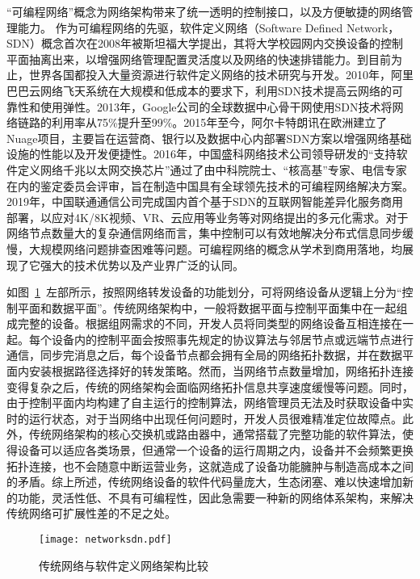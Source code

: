 “可编程网络”概念为网络架构带来了统一透明的控制接口，以及方便敏捷的网络管理能力。
作为可编程网络的先驱，软件定义网络（Software Defined Network，SDN）概念首次在2008年被斯坦福大学提出，其将大学校园网内交换设备的控制平面抽离出来，以增强网络管理配置灵活度以及网络的快速排错能力。到目前为止，世界各国都投入大量资源进行软件定义网络的技术研究与开发。2010年，阿里巴巴云网络飞天系统在大规模和低成本的要求下，利用SDN技术提高云网络的可靠性和使用弹性。2013年，Google公司的全球数据中心骨干网使用SDN技术将网络链路的利用率从75\%提升至99\%。2015年至今，阿尔卡特朗讯在欧洲建立了Nuage项目，主要旨在运营商、银行以及数据中心内部署SDN方案以增强网络基础设施的性能以及开发便捷性。2016年，中国盛科网络技术公司领导研发的“支持软件定义网络千兆以太网交换芯片”通过了由中科院院士、“核高基”专家、电信专家在内的鉴定委员会评审，旨在制造中国具有全球领先技术的可编程网络解决方案。2019年，中国联通通信公司完成国内首个基于SDN的互联网智能差异化服务商用部署，以应对4K/8K视频、VR、云应用等业务等对网络提出的多元化需求。对于网络节点数量大的复杂通信网络而言，集中控制可以有效地解决分布式信息同步缓慢，大规模网络问题排查困难等问题。可编程网络的概念从学术到商用落地，均展现了它强大的技术优势以及产业界广泛的认同。


\label{chap112}


如图~\ref{fig:networksdn}~左部所示，按照网络转发设备的功能划分，可将网络设备从逻辑上分为“控制平面和数据平面”。传统网络架构中，一般将数据平面与控制平面集中在一起组成完整的设备。根据组网需求的不同，开发人员将同类型的网络设备互相连接在一起。每个设备内的控制平面会按照事先规定的协议算法与邻居节点或远端节点进行通信，同步完消息之后，每个设备节点都会拥有全局的网络拓扑数据，并在数据平面内安装根据路径选择好的转发策略。然而，当网络节点数量增加，网络拓扑连接变得复杂之后，传统的网络架构会面临网络拓扑信息共享速度缓慢等问题。同时，由于控制平面内均构建了自主运行的控制算法，网络管理员无法及时获取设备中实时的运行状态，对于当网络中出现任何问题时，开发人员很难精准定位故障点。此外，传统网络架构的核心交换机或路由器中，通常搭载了完整功能的软件算法，使得设备可以适应各类场景，但通常一个设备的运行周期之内，设备并不会频繁更换拓扑连接，也不会随意中断运营业务，这就造成了设备功能臃肿与制造高成本之间的矛盾。综上所述，传统网络设备的软件代码量庞大，生态闭塞、难以快速增加新的功能，灵活性低、不具有可编程性，因此急需要一种新的网络体系架构，来解决传统网络可扩展性差的不足之处。

\begin{figure}[!ht]
	\centering 
	\vspace{-1.5mm} 
	\texttt{[image: networksdn.pdf]}
	\caption{传统网络与软件定义网络架构比较} \label{fig:networksdn}
\end{figure}

